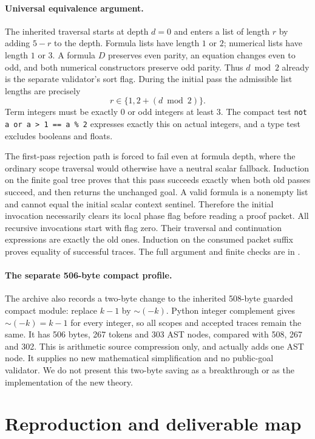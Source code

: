 \paragraph{Universal equivalence argument.}
The inherited traversal starts at depth $d=0$ and enters a list of length
$r$ by adding $5-r$ to the depth. Formula lists have length $1$ or $2$;
numerical lists have length $1$ or $3$. A formula $D$ preserves even parity,
an equation changes even to odd, and both numerical constructors preserve
odd parity. Thus $d\bmod2$ already is the separate validator's sort flag.
During the initial pass the admissible list lengths are precisely
\[
                  r\in\{1,2+(d\bmod2)\}.
\]
Term integers must be exactly $0$ or odd integers at least $3$. The compact
test \texttt{not a or a > 1 == a \% 2} expresses exactly this on actual
integers, and a type test excludes booleans and floats.

The first-pass rejection path is forced to fail even at formula depth, where
the ordinary scope traversal would otherwise have a neutral scalar fallback.
Induction on the finite goal tree proves that this pass succeeds exactly when
both old passes succeed, and then returns the unchanged goal. A valid formula
is a nonempty list and cannot equal the initial scalar context sentinel.
Therefore the initial invocation necessarily clears its local phase flag
before reading a proof packet. All recursive invocations start with flag zero.
Their traversal and continuation expressions are exactly the old ones.
Induction on the consumed packet suffix proves equality of successful traces.
The full argument and finite checks are in .

\paragraph{The separate 506-byte compact profile.}
The archive also records a two-byte change to the inherited 508-byte
guarded compact module: replace $k-1$ by $\mathord\sim(-k)$. Python integer
complement gives $\mathord\sim(-k)=k-1$ for every integer, so all scopes
and accepted traces remain the same. It has 506 bytes, 267 tokens and
303 AST nodes, compared with 508, 267 and 302. This is arithmetic
source compression only, and actually adds one AST node. It supplies no
new mathematical simplification and no public-goal validator. We do not
present this two-byte saving as a breakthrough or as the implementation of
the new theory.

\section{Reproduction and deliverable map}

